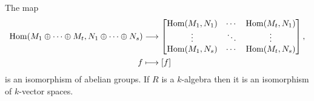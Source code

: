 \begin{theorem}
  \label{theorem: bijection homomorphisms matrices}
  The map
  \begin{align*}
    \operatorname{Hom}(M_1 \oplus \dotsb \oplus M_t, N_1 \oplus \dotsb \oplus N_s)
    &\longrightarrow
    \begin{bmatrix}
      \operatorname{Hom}(M_1, N_1)  & \cdots  & \operatorname{Hom}(M_t, N_1)  \\
      \vdots          & \ddots  & \vdots          \\
      \operatorname{Hom}(M_1, N_s)  & \cdots  & \operatorname{Hom}(M_t, N_s)
    \end{bmatrix},
    \\
    f
    &\longmapsto
    [f]
  \end{align*}
  is an isomorphism of abelian groups.
  If $R$ is a $k$-algebra then it is an isomorphism of $k$-vector spaces.
\end{theorem}


